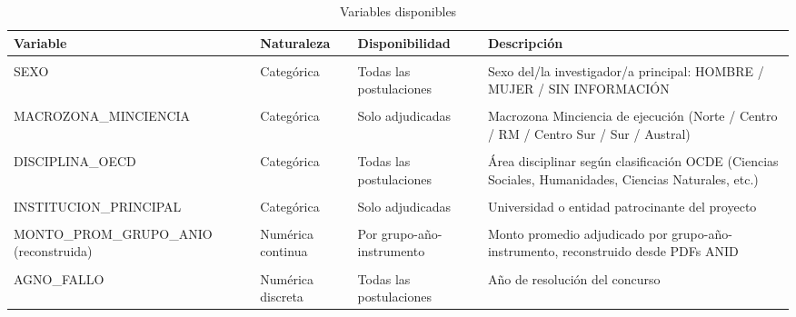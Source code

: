 \documentclass[
  12pt,
  letterpaper,
]{article}
\begin{document}
\begingroup\fontsize{9}{11}\selectfont

\begin{longtable}[t]{>{\raggedright\arraybackslash}p{4.5cm}ll>{\raggedright\arraybackslash}p{6cm}}

\caption{\label{tbl-var}Variables disponibles}

\tabularnewline

\toprule
Variable & Naturaleza & Disponibilidad & Descripción\\
\midrule
\cellcolor{gray!10}{ESTADO\_RESOLUCION\_CONCURSO} & \cellcolor{gray!10}{Categórica} & \cellcolor{gray!10}{Todas las postulaciones} & \cellcolor{gray!10}{Resultado del concurso: ADJUDICADO / NO ADJUDICADO}\\
SEXO & Categórica & Todas las postulaciones & Sexo del/la investigador/a principal: HOMBRE / MUJER / SIN INFORMACIÓN\\
\cellcolor{gray!10}{REGION\_EJECUCION} & \cellcolor{gray!10}{Categórica} & \cellcolor{gray!10}{Solo adjudicadas} & \cellcolor{gray!10}{Región de ejecución del proyecto}\\
MACROZONA\_MINCIENCIA & Categórica & Solo adjudicadas & Macrozona Minciencia de ejecución (Norte / Centro / RM / Centro Sur / Sur / Austral)\\
\cellcolor{gray!10}{INSTRUMENTO} & \cellcolor{gray!10}{Categórica} & \cellcolor{gray!10}{Todas las postulaciones} & \cellcolor{gray!10}{Instrumento FONDECYT: REGULAR / INICIACION}\\
\addlinespace
DISCIPLINA\_OECD & Categórica & Todas las postulaciones & Área disciplinar según clasificación OCDE (Ciencias Sociales, Humanidades, Ciencias Naturales, etc.)\\
\cellcolor{gray!10}{GRUPO\_ESTUDIO} & \cellcolor{gray!10}{Categórica} & \cellcolor{gray!10}{Solo adjudicadas} & \cellcolor{gray!10}{Grupo de evaluación al que postuló el proyecto (clasificación ANID)}\\
INSTITUCION\_PRINCIPAL & Categórica & Solo adjudicadas & Universidad o entidad patrocinante del proyecto\\
\cellcolor{gray!10}{MONTO\_ADJUDICADO} & \cellcolor{gray!10}{Numérica continua} & \cellcolor{gray!10}{Solo adjudicadas} & \cellcolor{gray!10}{Monto en pesos chilenos efectivamente adjudicado al proyecto}\\
MONTO\_PROM\_GRUPO\_ANIO (reconstruida) & Numérica continua & Por grupo-año-instrumento & Monto promedio adjudicado por grupo-año-instrumento, reconstruido desde PDFs ANID\\
\addlinespace
\cellcolor{gray!10}{MONTO\_SOLIC\_PROM\_GRUPO\_ANIO (creada)} & \cellcolor{gray!10}{Numérica continua} & \cellcolor{gray!10}{Por grupo-año-instrumento} & \cellcolor{gray!10}{Monto promedio solicitado por grupo-año-instrumento, calculado desde PDFs ANID}\\
AGNO\_FALLO & Numérica discreta & Todas las postulaciones & Año de resolución del concurso\\
\bottomrule

\end{longtable}
\end{document}

